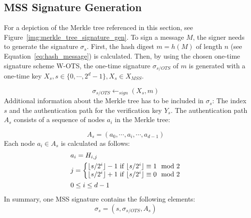\subsection{MSS Signature Generation}
\label{sec:mss_sig_gen}
For a depiction of the Merkle tree referenced in this section, see Figure~\ref{img:merkle_tree_signature_gen}. 
To sign a message $M$, the signer needs to generate the signature $\sigma_s$.
First, the hash digest $m = h(M)$ of length $n$ (see Equation~\ref{eq:hash_message}) is calculated. Then, by using the chosen one-time signature scheme W-OTS, the one-time signature $\sigma_{s/OTS}$ of $m$ is generated with a one-time key $X_s, s \in \{0, \cdots, 2^d - 1\}, X_s \in X_{MSS}$. %

\begin{equation}
\label{eq:merkle_s/OTS_signature}
\sigma_{s/OTS} \leftarrow_{sign} (X_s, m) 
\end{equation}
Additional information about the Merkle tree has to be included in $\sigma_s$: The index $s$ and the authentication path for the verification key $Y_s$. The authentication path $A_s$ consists of a sequence of nodes $a_i$ in the Merkle tree:

\begin{equation}
A_s = (a_0,\cdots, a_i, \cdots, a_{d-1})
\end{equation}
Each node $a_i \in A_s$ is calculated as follows:
\begin{align}
\label{eq:auth_path_calculation_merkle_tree}
&a_{i} = H_{i, j} \\
&j = 
\left\{\begin{matrix} \nonumber
\lfloor s/2^i\rfloor-1 \text{ if } \lfloor s/2^i\rfloor \equiv 1 \mod{2} \\
\lfloor s/2^i\rfloor+1 \text{ if } \lfloor s/2^i\rfloor \equiv 0 \mod{2}
\end{matrix}\right.  \nonumber \\
&0 \leq i \leq d-1 \nonumber
\end{align}
In summary, one MSS signature contains the following elements:
\begin{equation}
\label{eq:complete_merkle_signature_for_one_Ys}
\sigma_s = (s,\sigma_{s/OTS}, A_s) 
\end{equation}

